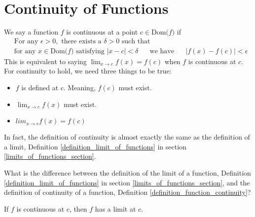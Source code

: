 \section{Continuity of Functions}

\begin{definition}
We say a function $f$ is continuous at a point $c \in \text{Dom($f$)}$ if
\begin{align*}
    &\text{For any} \hspace{4pt} \epsilon > 0, \hspace{4pt} \text{there exists a} \hspace{4pt} \delta > 0 \hspace{4pt} \text{such that}\\[2ex]
    &\text{for any} \hspace{4pt} x \in \text{Dom($f$)} \hspace{4pt} \text{satisfying} \hspace{4pt} \lvert x - c \rvert < \delta \hspace{20pt} \text{we have} \hspace{20pt} \lvert f(x) - f(c) \rvert < \epsilon
\end{align*}
This is equivalent to saying $\lim_{x \longrightarrow c} f(x) = f(c)$ when $f$ is continuous at $c$. For continuity to hold, we need three things to be true:
\begin{itemize}
    \item $f$ is defined at $c$. Meaning, $f(c)$ must exist.
    \item $\lim_{x \longrightarrow c} f(x)$ must exist.
    \item $lim_{x \longrightarrow c} f(x) = f(c)$
\end{itemize}
In fact, the definition of continuity is almost exactly the same as the definition of a limit, Definition \ref{definition_limit_of_functions} in section \ref{limits_of_functions_section}.
\label{definition_function_continuity}
\end{definition}

\begin{exercise}
What is the difference between the definition of the limit of a function, Definition \ref{definition_limit_of_functions} in section \ref{limits_of_functions_section}, and the definition of continuity of a function, Definition \ref{definition_function_continuity}?
\end{exercise}

\begin{theorem}
If $f$ is continuous at $c$, then $f$ has a limit at $c$.
\end{theorem}

